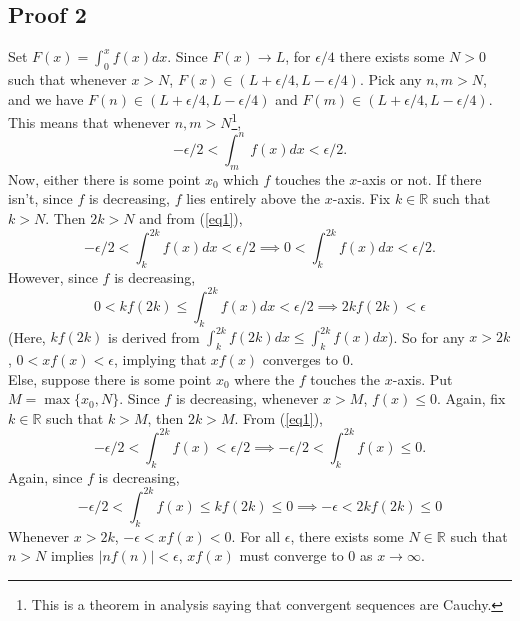 \documentclass[12pt,a4paper]{article}
\begin{document}
    \subsection*{Proof 2} Set $F(x) = \int_0 ^x f(x) dx$. Since $F(x) \to L$, for $\epsilon/4$ there exists some $N>0$ such that whenever $x>N$, $F(x) \in (L+\epsilon/4, L-\epsilon/4)$. Pick any $n,m >N$, and we have $F(n) \in (L+\epsilon/4, L-\epsilon/4)$ and $F(m) \in (L+\epsilon/4, L-\epsilon/4)$. This means that whenever $n,m >N$\footnote{This is a theorem in analysis saying that convergent sequences are Cauchy.},
    \begin{equation}
        -\epsilon/2<\int^n_m f(x) dx<\epsilon/2. \label{eq1} 
    \end{equation}
    Now, either there is some point $x_0$ which $f$ touches the $x$-axis or not. If there isn't, since $f$ is decreasing, $f$ lies entirely above the $x$-axis. Fix $k \in \mathbb{R}$ such that $k>N$. Then $2k>N$ and from (\ref{eq1}),
    \begin{equation*}
        -\epsilon/2<\int^{2k}_k f(x) dx < \epsilon/2 \implies 0<\int^{2k}_k f(x) dx < \epsilon/2.
    \end{equation*}
    However, since $f$ is decreasing, 
    \begin{equation*}
        0< kf(2k) \leq \int^{2k}_k f(x) dx < \epsilon/2 \implies 2kf(2k)<\epsilon
    \end{equation*}
    (Here, $kf(2k)$ is derived from $\int^{2k}_k f(2k) dx \leq \int^{2k}_k f(x) dx$). So for any $x>2k$, $0<xf(x)<\epsilon$, implying that $xf(x)$ converges to 0. \\
    
    Else, suppose there is some point $x_0$ where the $f$ touches the $x$-axis. Put $M=\max\{x_0, N\}$. Since $f$ is decreasing, whenever $x>M$, $f(x) \leq 0$. Again, fix $k \in \mathbb{R}$ such that $k>M$, then $2k>M$. From (\ref{eq1}),
    \begin{equation*}
        -\epsilon/2<\int^{2k}_k f(x) < \epsilon/2 \implies -\epsilon/2<\int^{2k}_k f(x) \leq 0.
    \end{equation*}
    Again, since $f$ is decreasing, 
    \begin{equation*}
        -\epsilon/2 < \int^{2k}_k f(x) \leq kf(2k) \leq 0 \implies -\epsilon < 2kf(2k)\leq 0
    \end{equation*}
    Whenever $x>2k$, $-\epsilon<xf(x)<0$. For all $\epsilon$, there exists some $N \in \mathbb{R}$ such that $n>N$ implies $|nf(n)|<\epsilon$, $xf(x)$ must converge to $0$ as $x \to \infty$. 
\end{document}
